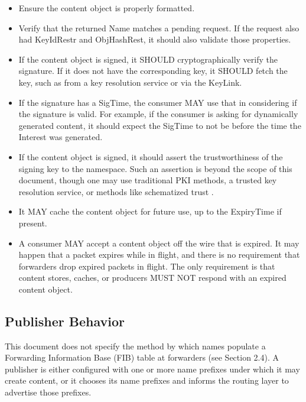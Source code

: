 \documentclass[12pt]{article}
\begin{document}
\begin{itemize}
\item Ensure the content object is properly formatted.

\item Verify that the returned Name matches a pending request.  If the
      request also had KeyIdRestr and ObjHashRest, it should also
      validate those properties.

\item If the content object is signed, it SHOULD cryptographically
      verify the signature.  If it does not have the corresponding key,
      it SHOULD fetch the key, such as from a key resolution service or
      via the KeyLink.

\item If the signature has a SigTime, the consumer MAY use that in
      considering if the signature is valid.  For example, if the
      consumer is asking for dynamically generated content, it should
      expect the SigTime to not be before the time the Interest was
      generated.

\item If the content object is signed, it should assert the
      trustworthiness of the signing key to the namespace.  Such an
      assertion is beyond the scope of this document, though one may use
      traditional PKI methods, a trusted key resolution service, or
      methods like schematized trust \cite{yu2015schematizing}.

\item It MAY cache the content object for future use, up to the
      ExpiryTime if present.

\item A consumer MAY accept a content object off the wire that is
      expired.  It may happen that a packet expires while in flight, and
      there is no requirement that forwarders drop expired packets in
      flight.  The only requirement is that content stores, caches, or
      producers MUST NOT respond with an expired content object.
\end{itemize}

\subsection{Publisher Behavior}
This document does not specify the method by which names populate a
Forwarding Information Base (FIB) table at forwarders (see
Section 2.4).  A publisher is either configured with one or more name
prefixes under which it may create content, or it chooses its name
prefixes and informs the routing layer to advertise those prefixes.
\end{document}
